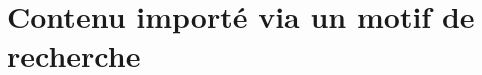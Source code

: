 \documentclass[varwidth, border = 3pt]{standalone}
\begin{document}
\section*{Contenu importé via un motif de recherche}

\end{document}
